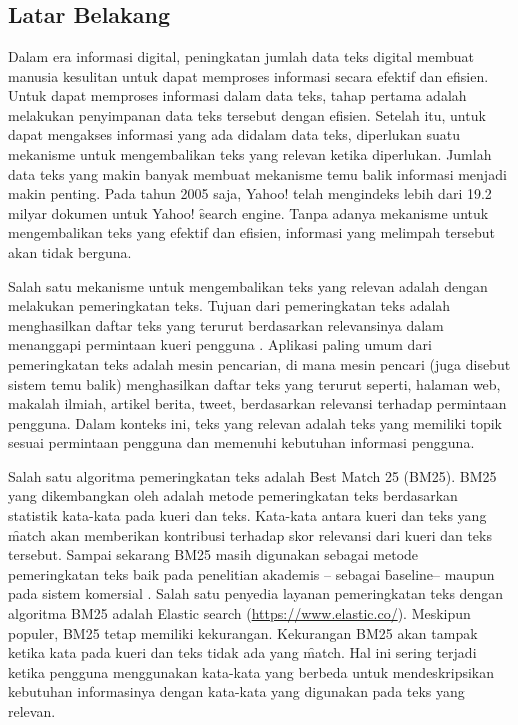 \chapter{\babSatu}
\label{bab:1}

\section{Latar Belakang}
\label{sec:latar-belakang}

Dalam era informasi digital, peningkatan jumlah data teks digital membuat manusia kesulitan untuk dapat memproses informasi secara efektif dan efisien. Untuk dapat memproses informasi dalam data teks, tahap pertama adalah melakukan penyimpanan data teks tersebut dengan efisien. Setelah itu, untuk dapat mengakses informasi yang ada didalam data teks, diperlukan suatu mekanisme untuk mengembalikan teks yang relevan ketika diperlukan. Jumlah data teks yang makin banyak membuat mekanisme temu balik informasi menjadi makin penting. Pada tahun 2005 saja, Yahoo! telah mengindeks lebih dari 19.2 milyar dokumen \citep{LETOR} untuk Yahoo! \f{search engine}. Tanpa adanya mekanisme untuk mengembalikan teks yang efektif dan efisien, informasi yang melimpah tersebut akan tidak berguna.

Salah satu mekanisme untuk mengembalikan teks yang relevan adalah dengan melakukan pemeringkatan teks. Tujuan dari pemeringkatan teks adalah menghasilkan daftar teks yang terurut berdasarkan relevansinya dalam menanggapi permintaan kueri pengguna \citep{textrankingsurvey}. Aplikasi paling umum dari pemeringkatan teks adalah mesin pencarian, di mana mesin pencari (juga disebut sistem temu balik) menghasilkan daftar teks yang terurut seperti, halaman web, makalah ilmiah, artikel berita, tweet, berdasarkan relevansi terhadap permintaan pengguna. Dalam konteks ini, teks yang relevan adalah teks yang memiliki topik sesuai permintaan pengguna dan memenuhi kebutuhan informasi pengguna.

Salah satu algoritma pemeringkatan teks adalah \f{Best Match} 25 (BM25). BM25 yang dikembangkan oleh \cite{BM25ori} adalah metode pemeringkatan teks berdasarkan statistik kata-kata pada kueri dan teks. Kata-kata antara kueri dan teks yang \f{match} akan memberikan kontribusi terhadap skor relevansi dari kueri dan teks tersebut. Sampai sekarang BM25 masih digunakan sebagai metode pemeringkatan teks baik pada penelitian akademis -- sebagai \f{baseline}-- maupun pada sistem komersial \citep{textrankingsurvey}. Salah satu penyedia layanan pemeringkatan teks dengan algoritma BM25 adalah Elastic search (\url{https://www.elastic.co/}). Meskipun populer, BM25 tetap memiliki kekurangan. Kekurangan BM25 akan tampak ketika kata pada kueri dan teks tidak ada yang \f{match}. Hal ini sering terjadi ketika pengguna menggunakan kata-kata yang berbeda untuk mendeskripsikan kebutuhan informasinya dengan kata-kata yang digunakan pada teks yang relevan.

